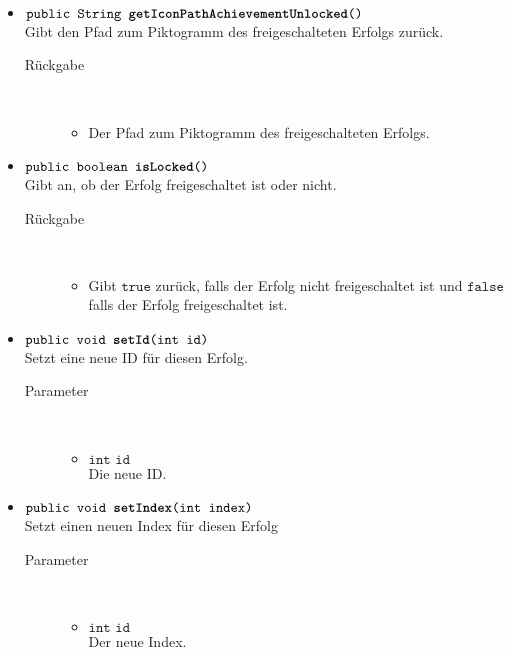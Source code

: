 \begin{description}
\begin{itemize}
		\item $\texttt{public String \textbf{getIconPathAchievementUnlocked}()}$ \\ Gibt den Pfad zum Piktogramm des freigeschalteten Erfolgs zurück.
				\begin{description}
					\item[Rückgabe] \hfill \\
					\vspace{-.8cm}
					\begin{itemize}
						\item Der Pfad zum Piktogramm des freigeschalteten Erfolgs.
					\end{itemize}
				\end{description}
		
		\item $\texttt{public boolean \textbf{isLocked}()}$ \\ Gibt an, ob der Erfolg freigeschaltet ist oder nicht.
				\begin{description}
					\item[Rückgabe] \hfill \\
					\vspace{-.8cm}
					\begin{itemize}
						\item Gibt $\texttt{true}$ zurück, falls der Erfolg nicht freigeschaltet ist und $\texttt{false}$ falls der Erfolg freigeschaltet ist.
					\end{itemize}
				\end{description}
		
			\item $\texttt{public void \textbf{setId}(int id)}$ \\ Setzt eine neue ID für diesen Erfolg.
				\begin{description}
					\item[Parameter] \hfill \\
					\vspace{-.8cm}
					\begin{itemize}
						\item $\texttt{int id}$ \\ Die neue ID.
					\end{itemize}
				\end{description}
		
			\item $\texttt{public void \textbf{setIndex}(int index)}$ \\ Setzt einen neuen Index für diesen Erfolg
				\begin{description}
					\item[Parameter] \hfill \\
					\vspace{-.8cm}
					\begin{itemize}
						\item $\texttt{int id}$ \\ Der neue Index.
					\end{itemize}
				\end{description}
				

\end{itemize}
\end{description}

